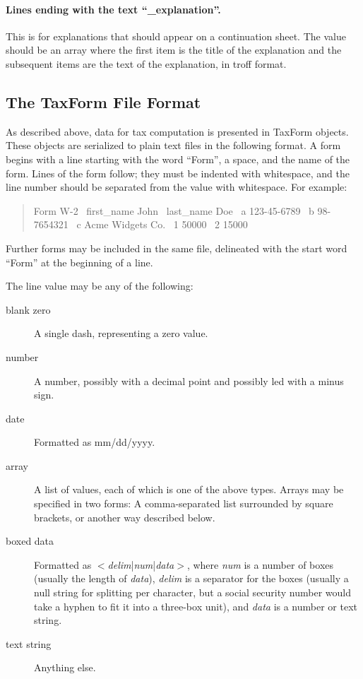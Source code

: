 \documentclass[12pt]{article}
\begin{document}
\paragraph{Lines ending with the text ``\_explanation''.} This is for
explanations that should appear on a continuation sheet. The value should be an
array where the first item is the title of the explanation and the subsequent
items are the text of the explanation, in troff format.





\subsection{The TaxForm File Format}

As described above, data for tax computation is presented in TaxForm objects.
These objects are serialized to plain text files in the following format.
A form begins with a line starting with the word ``Form'', a space, and the
name of the form. Lines of the form follow; they must be indented with
whitespace, and the line number should be separated from the value with
whitespace. For example:
\begin{quote}
\ttfamily\obeylines\obeyspaces
Form W-2
\     first\_name          John
\     last\_name           Doe
\     a                   123-45-6789
\     b                   98-7654321
\     c                   Acme Widgets Co.
\     1                   50000
\     2                   15000
\end{quote}
Further forms may be included in the same file, delineated with the start word
``Form'' at the beginning of a line.

The line value may be any of the following:
\begin{description}
\item[blank zero] A single dash, representing a zero value.
\item[number] A number, possibly with a decimal point and possibly led with a
minus sign.
\item[date] Formatted as mm/dd/yyyy.
\item[array] A list of values, each of which is one of the above types. Arrays
may be specified in two forms: A comma-separated list surrounded by square
brackets, or another way described below.
\item[boxed data] Formatted as
$<$\emph{delim}|\emph{num}|\emph{data}$>$, where \emph{num} is a
number of boxes (usually the length of \emph{data}), \emph{delim} is a separator
for the boxes (usually a null string for splitting per character, but a social
security number would take a hyphen to fit it into a three-box unit), and
\emph{data} is a number or text string.
\item[text string] Anything else.
\end{description}
\end{document}
